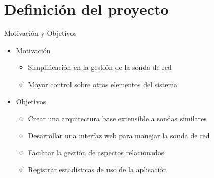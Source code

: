 \section{Definición del proyecto}

\begin{frame}{Motivación y Objetivos}
  \begin{itemize}
    \item Motivación
    \begin{itemize}
      \item Simplificación en la gestión de la sonda de red
      \item Mayor control sobre otros elementos del sistema
    \end{itemize}
    \item Objetivos
    \begin{itemize}
      \item Crear una arquitectura base extensible a sondas similares
      \item Desarrollar una interfaz web para manejar la sonda de red
      \item Facilitar la gestión de aspectos relacionados
      \item Registrar estadísticas de uso de la aplicación
    \end{itemize}
  \end{itemize}
\end{frame}
